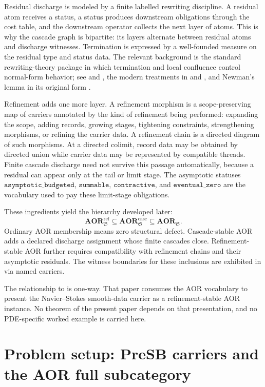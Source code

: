 \documentclass[11pt]{article}
\newcommand{\AOR}{\mathbf{AOR}}
\newcommand{\CascadeStableAOR}{\mathbf{AOR}^{\mathrm{casc}}}
\newcommand{\RefStableAOR}{\mathbf{AOR}^{\mathrm{ref}}}
\newcommand{\asymptoticBudgeted}{\texttt{asymptotic\_budgeted}}
\newcommand{\summable}{\texttt{summable}}
\newcommand{\contractive}{\texttt{contractive}}
\newcommand{\eventualZero}{\texttt{eventual\_zero}}
\theoremstyle{definition}
\begin{document}
Residual discharge is modeled by a finite labelled rewriting discipline.
A residual atom receives a status, a status produces downstream obligations
through the cost table, and the downstream operator collects the next layer
of atoms.  This is why the cascade graph is bipartite: its layers alternate
between residual atoms and discharge witnesses.  Termination is expressed by
a well-founded measure on the residual type and status data.  The relevant
background is the standard rewriting-theory package in which termination
and local confluence control normal-form behavior; see
\citet{KnuthBendix1970SimpleWord} and \citet{Huet1980ConfluentReductions},
the modern treatments in \citet{BaaderNipkow1998TermRewriting} and
\citet{Terese2003TermRewriting}, and Newman's lemma in its original form
\citep{Newman1942Combinatorial}.

Refinement adds one more layer.  A refinement morphism is a
scope-preserving map of carriers annotated by the kind of refinement being
performed: expanding the scope, adding records, growing stages, tightening
constraints, strengthening morphisms, or refining the carrier data.  A
refinement chain is a directed diagram of such morphisms.  At a directed
colimit, record data may be obtained by directed union while carrier data
may be represented by compatible threads.  Finite cascade discharge need not
survive this passage automatically, because a residual can appear only at
the tail or limit stage.  The asymptotic statuses
\(\asymptoticBudgeted\), \(\summable\), \(\contractive\), and
\(\eventualZero\) are the vocabulary used to pay these limit-stage
obligations.

These ingredients yield the hierarchy developed later:
\[
  \RefStableAOR_{\mathfrak S}
  \subseteq
  \CascadeStableAOR_{\mathfrak S}
  \subseteq
  \AOR_{\mathfrak S}.
\]
Ordinary AOR membership means zero structural defect.  Cascade-stable
AOR adds a declared discharge assignment whose finite cascades close.
Refinement-stable AOR further requires compatibility with refinement
chains and their asymptotic residuals.  The witness boundaries for these
inclusions are exhibited in  via named carriers.

The relationship to \citet{Tsiokos2026NavierStokes} is one-way.  That
paper consumes the AOR vocabulary to present the Navier--Stokes
smooth-data carrier as a refinement-stable AOR instance.  No
theorem of the present paper depends on that presentation, and no
PDE-specific worked example is carried here.
 \section{Problem setup: PreSB carriers and the AOR full subcategory}\label{sec:aor-problem-setup}
\end{document}
